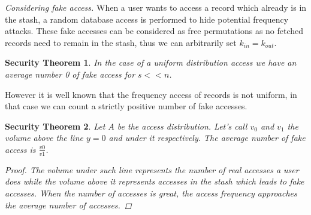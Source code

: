 \documentclass{llncs}
\newtheorem{secthm}{Security Theorem}
\begin{document}
\noindent\textit{Considering fake access.} When a user wants to access a record which already is in the stash, a random database access is performed to hide potential frequency attacks. These fake accesses can be considered as free permutations as no fetched records need to remain in the stash, thus we can arbitrarily set $k_{in}=k_{out}$.
%
\begin{secthm}
In the case of a uniform distribution access we have an average number 0 of fake access for $s<<n$.
\end{secthm}
%
However it is well known that the frequency access of records is not uniform, in that case we can count a strictly positive number of fake accesses.
\begin{secthm}
Let $A$ be the access distribution. Let's call $v_0$ and $v_1$ the volume above the line $y=0$ and under it respectively.
The average number of fake access is $ \frac{v0}{v1}$.
\begin{proof}
 The volume under such line represents the number of real accesses a user does while the volume above it represents accesses in the stash which leads to fake accesses.
 When the number of accesses is great, the access frequency approaches the average number of accesses.
\end{proof}
\end{secthm}
\end{document}

